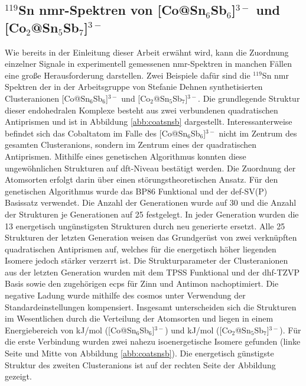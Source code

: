 \subsection{\texorpdfstring{$^{119}$Sn \acs{nmr}-Spektren von [Co@Sn$_6$Sb$_6$]$^{3-}$ und [Co$_2$@Sn$_5$Sb$_7$]$^{3-}$}{119Sn NMR Spektren von [Co at Sn\_6Sb\_6]3- und [Co\_2 at Sn\_5Sb\_7]3-}}
Wie bereits in der Einleitung dieser Arbeit erwähnt wird, kann die Zuordnung einzelner Signale in experimentell gemessenen \ac{nmr}-Spektren in manchen Fällen eine große Herausforderung darstellen. Zwei Beispiele dafür sind die $^{119}$Sn \ac{nmr} Spektren der in der Arbeitsgruppe von Stefanie Dehnen synthetisierten Clusteranionen [Co@Sn$_6$Sb$_6$]$^{3-}$ und [Co$_2$@Sn$_5$Sb$_7$]$^{3-}$.\supercite{wilson2018structure} Die grundlegende Struktur dieser endohedralen Komplexe besteht aus zwei verbundenen quadratischen Antiprismen und ist in Abbildung \ref{abb:coatsnsb} dargestellt. Interessanterweise befindet sich das Cobaltatom im Falle des [Co@Sn$_6$Sb$_6$]$^{3-}$ nicht im Zentrum des gesamten Clusteranions, sondern im Zentrum eines der quadratischen Antiprismen. Mithilfe eines genetischen Algorithmus\supercite{weigend2014extending} konnten diese ungewöhnlichen Strukturen auf \ac{dft}-Niveau bestätigt werden. Die Zuordnung der Atomsorten erfolgt darin über einen störungstheoretischen Ansatz. Für den genetischen Algorithmus wurde das BP86 Funktional\supercite{perdew1986density,becke1988density} und der def-SV(P) Basissatz\supercite{eichkorn1997auxiliary} verwendet. Die Anzahl der Generationen wurde auf 30 und die Anzahl der Strukturen je Generationen auf 25 festgelegt. In jeder Generation wurden die 13 energetisch ungünstigsten Strukturen durch neu generierte ersetzt. Alle 25 Strukturen der letzten Generation weisen das Grundgerüst von zwei verknüpften quadratischen Antiprismen auf, welches für die energetisch höher liegenden Isomere jedoch stärker verzerrt ist. Die Strukturparameter der Clusteranionen aus der letzten Generation wurden  mit dem TPSS Funktional\supercite{tao2003climbing} und der dhf-TZVP Basis\supercite{weigend2010segmented} sowie den zugehörigen \acp{ecp}\supercite{metz2000small} für Zinn und Antimon nachoptimiert. Die negative Ladung wurde mithilfe des \acp{cosmo}\supercite{klamt1993cosmo} unter Verwendung der Standardeinstellungen kompensiert. Insgesamt unterscheiden sich die Strukturen im Wesentlichen durch die Verteilung der Atomsorten und liegen in einem Energiebereich von \unit[37]{kJ/mol} ([Co@Sn$_6$Sb$_6$]$^{3-}$) und \unit[22]{kJ/mol} ([Co$_2$@Sn$_5$Sb$_7$]$^{3-}$). Für die erste Verbindung wurden zwei nahezu isoenergetische Isomere gefunden (linke Seite und Mitte von Abbildung \ref{abb:coatsnsb}). Die energetisch günstigste Struktur des zweiten Clusteranions ist auf der rechten Seite der Abbildung gezeigt.

